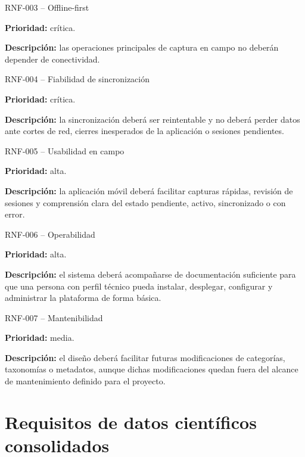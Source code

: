 \begin{requisitocard}{RNF-003 -- Offline-first}

\textbf{Prioridad:} crítica.

\textbf{Descripción:} las operaciones principales de captura en campo no deberán
depender de conectividad.

\end{requisitocard}

\begin{requisitocard}{RNF-004 -- Fiabilidad de sincronización}

\textbf{Prioridad:} crítica.

\textbf{Descripción:} la sincronización deberá ser reintentable y no deberá perder
datos ante cortes de red, cierres inesperados de la aplicación o sesiones
pendientes.

\end{requisitocard}

\begin{requisitocard}{RNF-005 -- Usabilidad en campo}

\textbf{Prioridad:} alta.

\textbf{Descripción:} la aplicación móvil deberá facilitar capturas rápidas,
revisión de sesiones y comprensión clara del estado pendiente, activo,
sincronizado o con error.

\end{requisitocard}

\begin{requisitocard}{RNF-006 -- Operabilidad}

\textbf{Prioridad:} alta.

\textbf{Descripción:} el sistema deberá acompañarse de documentación suficiente
para que una persona con perfil técnico pueda instalar, desplegar, configurar y
administrar la plataforma de forma básica.

\end{requisitocard}

\begin{requisitocard}{RNF-007 -- Mantenibilidad}

\textbf{Prioridad:} media.

\textbf{Descripción:} el diseño deberá facilitar futuras modificaciones de
categorías, taxonomías o metadatos, aunque dichas modificaciones quedan fuera del
alcance de mantenimiento definido para el proyecto.

\end{requisitocard}

\section{Requisitos de datos científicos consolidados}

